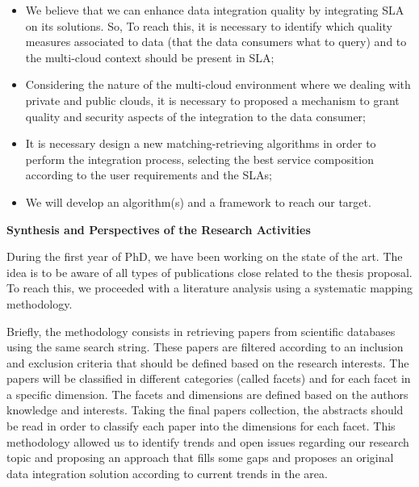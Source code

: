 \documentclass[12pt,a4paper,oneside]{report}
\begin{document}
\begin{itemize}

\item We believe that we can enhance data integration quality by integrating SLA on its solutions. So, To reach this, it is necessary to identify which quality measures associated to data (that the data consumers what to query) and to the multi-cloud context should be present in SLA;

\item Considering the nature of the multi-cloud environment where we dealing with private and public clouds, it is necessary to proposed a mechanism to grant quality and security aspects of the integration to the data consumer;


\item It is necessary design a new matching-retrieving algorithms in order to perform the integration process, selecting the best service composition according to the user requirements and the SLAs;

\item We will develop an algorithm(s) and a framework to reach our target.
\end{itemize}

 
\begin{flushleft}
\textbf{Synthesis and Perspectives of the Research Activities}\\
\end{flushleft}

During the first year of PhD, we have been working on the state of the art. 
The idea is to be aware of all types of publications close related to the thesis proposal. To reach this, we proceeded with a literature analysis using a systematic mapping methodology. 

Briefly, the methodology consists in retrieving papers from scientific databases using the same search string. These papers are filtered according to an inclusion and exclusion criteria that should be defined based on the research interests. The papers will be classified in different categories (called facets) and for each facet in a specific dimension. The facets and dimensions are defined based on the authors knowledge and interests. Taking the final papers collection, the abstracts should be read in order to classify each paper into the dimensions for each facet. 
This methodology allowed us to identify trends and open issues regarding our research topic and proposing an approach that fills some gaps and proposes an original data integration solution according to current trends in the area.
\end{document}
